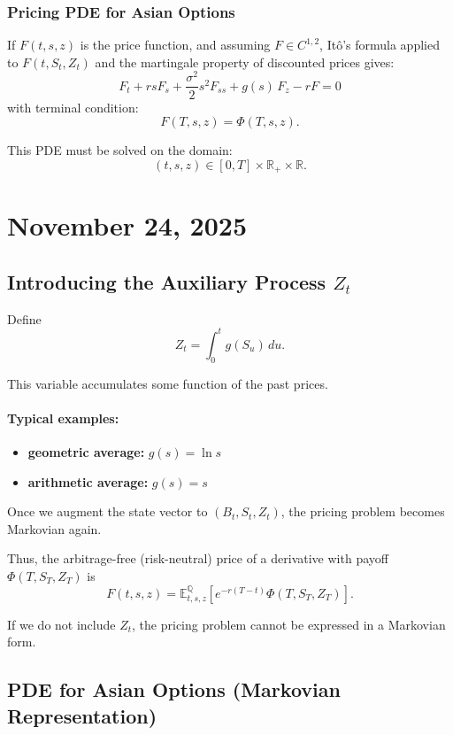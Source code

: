 \documentclass[12pt,a4paper]{article}
\theoremstyle{definition}
\begin{document}
\subsubsection{Pricing PDE for Asian Options}

If $F(t, s, z)$ is the price function, and assuming $F \in C^{1,2}$, Itô's formula applied to $F(t, S_t, Z_t)$ and the martingale property of discounted prices gives:
\[
\boxed{
F_t + rs F_s + \frac{\sigma^2}{2} s^2 F_{ss} + g(s)\, F_z - rF = 0
}
\]
with terminal condition:
\[
F(T, s, z) = \Phi(T, s, z).
\]

This PDE must be solved on the domain:
\[
(t, s, z) \in [0, T] \times \mathbb{R}_+ \times \mathbb{R}.
\]

\newpage
\section{November 24, 2025}

\subsection{Introducing the Auxiliary Process $Z_t$}

Define
\[
Z_t = \int_0^t g(S_u)\, du.
\]

This variable accumulates some function of the past prices.

\paragraph{Typical examples:}
\begin{itemize}
\item \textbf{geometric average:} $g(s) = \ln s$
\item \textbf{arithmetic average:} $g(s) = s$
\end{itemize}

Once we augment the state vector to $(B_t, S_t, Z_t)$, the pricing problem becomes Markovian again.

Thus, the arbitrage-free (risk-neutral) price of a derivative with payoff $\Phi(T, S_T, Z_T)$ is
\[
F(t, s, z) = \mathbb{E}_{t,s,z}^{\mathbb{Q}}\left[e^{-r(T-t)} \Phi(T, S_T, Z_T)\right].
\]

If we do not include $Z_t$, the pricing problem cannot be expressed in a Markovian form.

\subsection{PDE for Asian Options (Markovian Representation)}
\end{document}
